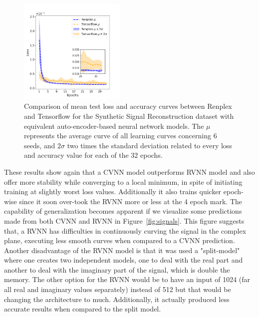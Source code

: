 \begin{figure}[htbp]
	\centering
	\includegraphics[width=0.45\textwidth]{ch4/assets/comp_dense_sigrec_loss.png}
	\caption{Comparison of mean test loss and accuracy curves between Renplex and Tensorflow for the Synthetic Signal Reconstruction dataset with equivalent auto-encoder-based neural network models. The $ \mu $ represents the average curve of all learning curves concerning 6 seeds, and $ 2\sigma $ two times the standard deviation related to every loss and accuracy value for each of the $ 32 $ epochs.}
	\label{fig:comp_dense_sig_loss}
\end{figure}

These results show again that a CVNN model outperforms RVNN model and also offer more stability while converging to a local minimum, in spite of initiating training at slightly worst loss values. Additionally it also trains quicker epoch-wise since it soon over-took the RVNN more or less at the 4 epoch mark. The capability of generalization becomes apparent if we visualize some predictions made from both CVNN and RVNN in Figure~\ref{fig:signals}. This figure suggests that, a RVNN has difficulties in continuously curving the signal in the complex plane, executing less smooth curves when compared to a CVNN prediction. Another disadvantage of the RVNN model is that it was used a "split-model" where one creates two independent models, one to deal with the real part and another to deal with the imaginary part of the signal, which is double the memory. The other option for the RVNN would be to have an input of 1024 (far all real and imaginary values separately) instead of 512 but that would be changing the architecture to much. Additionally, it actually produced less accurate results when compared to the split model.

